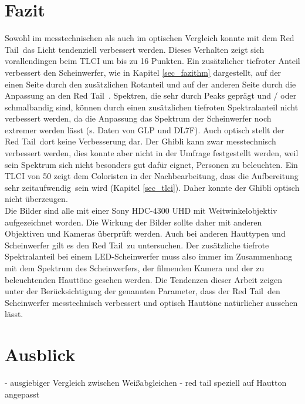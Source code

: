 \chapter{Fazit}
Sowohl im messtechnischen als auch im optischen Vergleich konnte mit dem \glqq Red Tail\grqq\ das Licht tendenziell verbessert werden. Dieses Verhalten zeigt sich vorallendingen beim TLCI um bis zu 16 Punkten. Ein zusätzlicher tiefroter Anteil verbessert den Scheinwerfer, wie in Kapitel \ref{sec_fazithm} dargestellt, auf der einen Seite durch den zusätzlichen Rotanteil und auf der anderen Seite durch die Anpassung an den \glqq Red Tail\grqq\ . Spektren, die sehr durch Peaks geprägt und / oder schmalbandig sind, können durch einen zusätzlichen tiefroten Spektralanteil nicht verbessert werden, da die Anpassung das Spektrum der Scheinwerfer noch extremer werden lässt (s. Daten von GLP und DL7F). Auch optisch stellt der \glqq Red Tail\grqq\ dort keine Verbesserung dar. Der Ghibli kann zwar messtechnisch verbessert werden, dies konnte aber nicht in der Umfrage festgestellt werden, weil sein Spektrum sich nicht besonders gut dafür eignet, Personen zu beleuchten. Ein TLCI von 50 zeigt dem Coloristen in der Nachbearbeitung, dass die \glqq Aufbereitung sehr zeitaufwendig\grqq\ sein wird (Kapitel \ref{sec_tlci}). Daher konnte der Ghibli optisch nicht überzeugen.\\
Die Bilder sind alle mit einer Sony HDC-4300 UHD mit Weitwinkelobjektiv aufgezeichnet worden. Die Wirkung der Bilder sollte daher mit anderen Objektiven und Kameras überprüft werden. Auch bei anderen Hauttypen und Scheinwerfer gilt es den \glqq Red Tail\grqq\ zu untersuchen. Der zusätzliche tiefrote Spektralanteil bei einem LED-Scheinwerfer muss also immer im Zusammenhang mit dem Spektrum des Scheinwerfers, der filmenden Kamera und der zu beleuchtenden Hauttöne gesehen werden. Die Tendenzen dieser Arbeit zeigen unter der Berücksichtigung der genannten Parameter, dass der \glqq Red Tail\grqq\ den Scheinwerfer messtechnisch verbessert und optisch Hauttöne natürlicher aussehen lässt.

  


\chapter{Ausblick}



- ausgiebiger Vergleich zwischen Weißabgleichen
- red tail speziell auf Hautton angepasst




